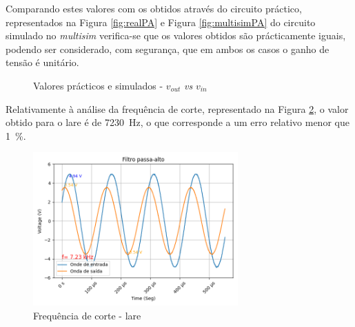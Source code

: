 Comparando estes valores com os obtidos através do circuito práctico, representados na Figura \ref{fig:realPA} e Figura \ref{fig:multisimPA} do circuito simulado no \textit{multisim} verifica-se que os valores obtidos são prácticamente iguais, podendo ser considerado, com segurança, que em ambos os casos o ganho de tensão é unitário. 

\begin{figure}[hbtp]
	\centering%
		\centering
		\qquad
		\caption{Valores prácticos e simulados - $v_{out}$ \textit{vs} $v_{in}$}%
		\label{fig:simulacaoPA}%
	\end{figure}

Relativamente à análise da frequência de corte, representado na Figura \ref{fig:fcvoutlare}, o valor obtido para o \acrshort{lare} é de \SI{7230}{\hertz}, o que corresponde a um erro relativo menor que \SI{1}{\percent}.

\begin{figure}[hbtp]
	\centering
	\includegraphics[width=0.7\textwidth]{figures/filtro_passa-alto_fc_LaRE.png}
	\caption{Frequência de corte - \acrshort{lare}}
	\label{fig:fcvoutlare}
\end{figure}

